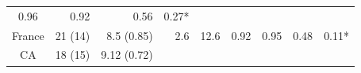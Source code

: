 \documentclass[fleqn,10pt,lineno]{wlpeerj} %
\theoremstyle{definition}
\theoremstyle{definition}
\theoremstyle{definition}
\theoremstyle{remark}
\begin{document}
\begin{longtable}[]{@{}crrrrllrl@{}}
\begin{minipage}[t]{0.11\columnwidth}
0.96\strut
\end{minipage} & \begin{minipage}[t]{0.06\columnwidth}\raggedright\strut
0.92\strut
\end{minipage} & \begin{minipage}[t]{0.06\columnwidth}\raggedleft\strut
0.56\strut
\end{minipage} & \begin{minipage}[t]{0.07\columnwidth}\raggedright\strut
0.27*\strut
\end{minipage}\tabularnewline
\begin{minipage}[t]{0.12\columnwidth}\centering\strut
France\strut
\end{minipage} & \begin{minipage}[t]{0.08\columnwidth}\raggedleft\strut
21 (14)\strut
\end{minipage} & \begin{minipage}[t]{0.13\columnwidth}\raggedleft\strut
8.5 (0.85)\strut
\end{minipage} & \begin{minipage}[t]{0.04\columnwidth}\raggedleft\strut
2.6\strut
\end{minipage} & \begin{minipage}[t]{0.05\columnwidth}\raggedleft\strut
12.6\strut
\end{minipage} & \begin{minipage}[t]{0.11\columnwidth}\raggedright\strut
0.92\strut
\end{minipage} & \begin{minipage}[t]{0.06\columnwidth}\raggedright\strut
0.95\strut
\end{minipage} & \begin{minipage}[t]{0.06\columnwidth}\raggedleft\strut
0.48\strut
\end{minipage} & \begin{minipage}[t]{0.07\columnwidth}\raggedright\strut
0.11*\strut
\end{minipage}\tabularnewline
\begin{minipage}[t]{0.12\columnwidth}\centering\strut
CA\strut
\end{minipage} & \begin{minipage}[t]{0.08\columnwidth}\raggedleft\strut
18 (15)\strut
\end{minipage} & \begin{minipage}[t]{0.13\columnwidth}\raggedleft\strut
9.12 (0.72)\strut
\end{minipage} & \begin{minipage}[t]{0.04\columnwidth}\raggedleft\strut

\end{minipage}
\end{longtable}
\end{document}
